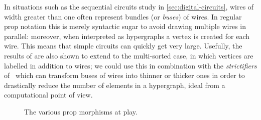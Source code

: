 In situations such as the sequential circuits study in \cref{sec:digital-circuits},
wires of width greater than one often represent bundles (or \emph{buses}) of
wires.
In regular prop notation this is merely syntactic sugar to avoid drawing
multiple wires in parallel: moreover, when interpreted as hypergraphs a vertex
is created for each wire.
This means that simple circuits can quickly get very large.
Usefully, the results of \cite{bonchi2022stringa} are also shown to extend to the
multi-sorted case, in which vertices are labelled in addition to wires; we could
use this in combination with the \emph{strictifiers} of~\cite{wilson2022string}
which can transform buses of wires into thinner or thicker ones in order to
drastically reduce the number of elements in a hypergraph, ideal from a
computational point of view.


\begin{figure}
    \centering
    
    \caption{The various prop morphisms at play.}
    \label{fig:roadmap}
\end{figure}